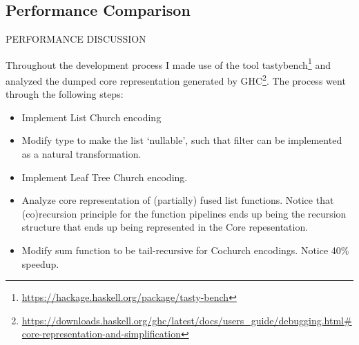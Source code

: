 \subsection{Performance Comparison}
PERFORMANCE DISCUSSION


Throughout the development process I made use of the tool tastybench\footnote{\url{https://hackage.haskell.org/package/tasty-bench}} and analyzed the dumped core representation generated by GHC\footnote{\url{https://downloads.haskell.org/ghc/latest/docs/users_guide/debugging.html\#core-representation-and-simplification}}.
The process went through the following steps:
\begin{itemize}
    \item Implement List Church encoding
    \item Modify type to make the list `nullable', such that filter can be implemented as a natural transformation.
    \item Implement Leaf Tree Church encoding.
    \item Analyze core representation of (partially) fused list functions. Notice that (co)recursion principle for the function pipelines ends up being the recursion structure that ends up being represented in the Core repesentation.
    \item Modify sum function to be tail-recursive for Cochurch encodings. Notice 40\% speedup.
\end{itemize}

\begin{figure}
    
\end{figure}

